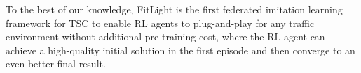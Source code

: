 To the best of our knowledge, FitLight is the first federated imitation learning framework for TSC to enable RL agents to plug-and-play for any traffic environment without additional pre-training cost, where the RL agent can achieve a high-quality initial solution in the first episode and then converge to an even better final result.

\vspace{-1ex}